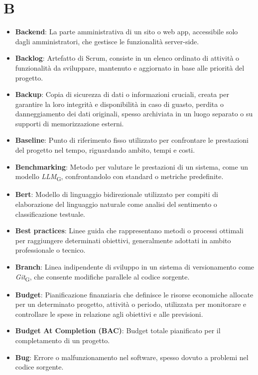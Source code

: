 \section*{B}  
\begin{itemize}
    \item \textbf{Backend}: La parte amministrativa di un sito o web app, accessibile solo dagli amministratori, che gestisce le funzionalità server-side.
    \item \textbf{Backlog}: Artefatto di Scrum, consiste in un elenco ordinato di attività o funzionalità da sviluppare, mantenuto e aggiornato in base alle priorità del progetto.
    \item \textbf{Backup}: Copia di sicurezza di dati o informazioni cruciali, creata per garantire la loro integrità e disponibilità in caso di guasto, perdita o danneggiamento dei dati originali, spesso archiviata in un luogo separato o su supporti di memorizzazione esterni.
    \item \textbf{Baseline}: Punto di riferimento fisso utilizzato per confrontare le prestazioni del progetto nel tempo, riguardando ambito, tempi e costi.
    \item \textbf{Benchmarking}: Metodo per valutare le prestazioni di un sistema, come un modello \textit{LLM}\textsubscript{G}, confrontandolo con standard o metriche predefinite.
    \item \textbf{Bert}: Modello di linguaggio bidirezionale utilizzato per compiti di elaborazione del linguaggio naturale come analisi del sentimento o classificazione testuale.
    \item \textbf{Best practices}: Linee guida che rappresentano metodi o processi ottimali per raggiungere determinati obiettivi, generalmente adottati in ambito professionale o tecnico.
    \item \textbf{Branch}: Linea indipendente di sviluppo in un sistema di versionamento come \textit{Git}\textsubscript{G}, che consente modifiche parallele al codice sorgente.
    \item \textbf{Budget}: Pianificazione finanziaria che definisce le risorse economiche allocate per un determinato progetto, attività o periodo, utilizzata per monitorare e controllare le spese in relazione agli obiettivi e alle previsioni.
    \item \textbf{Budget At Completion (BAC)}: Budget totale pianificato per il completamento di un progetto.
    \item \textbf{Bug}: Errore o malfunzionamento nel software, spesso dovuto a problemi nel codice sorgente.
\end{itemize}
